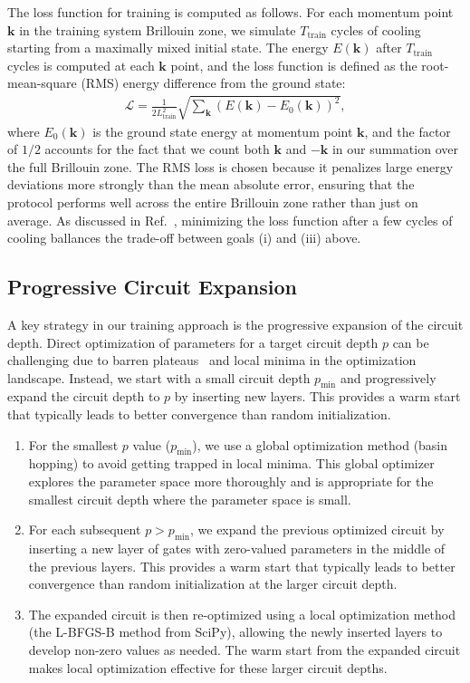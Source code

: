\documentclass[twocolumn,
aps,
prx,
showpacs,
amsmath,
amssymb,
floatfix,
longbibliography,
superscriptaddress,
eprint]
{revtex4-1}
\begin{document}
The loss function for training is computed as follows. For each momentum point $\bm{k}$ in the training system Brillouin zone, we simulate $T_{\text{train}}$ cycles of cooling starting from a maximally mixed initial state. The energy $E(\bm{k})$ after $T_{\text{train}}$ cycles is computed at each $\bm{k}$ point, and the loss function is defined as the root-mean-square (RMS) energy difference from the ground state:
\begin{align}
\mathcal{L} = \frac{1}{2L_{\text{train}}^2}\sqrt{\sum_{\bm{k}} \left(E(\bm{k}) - E_0(\bm{k})\right)^2},
\end{align}
where $E_0(\bm{k})$ is the ground state energy at momentum point $\bm{k}$, and the factor of $1/2$ accounts for the fact that we count both $\bm{k}$ and $-\bm{k}$ in our summation over the full Brillouin zone. The RMS loss is chosen because it penalizes large energy deviations more strongly than the mean absolute error, ensuring that the protocol performs well across the entire Brillouin zone rather than just on average.
As discussed in Ref.~\cite{song2025varicoolnonunitaryquantumvariational}, minimizing the loss function after a few cycles of cooling ballances the trade-off between goals (i) and (iii) above.

\subsection{Progressive Circuit Expansion}

A key strategy in our training approach is the progressive expansion of the circuit depth. Direct optimization of parameters for a target circuit depth $p$ can be challenging due to barren plateaus~\cite{Cerezo2021} and local minima in the optimization landscape. Instead, we start with a small circuit depth $p_{\min}$ and progressively expand the circuit depth to $p$ by inserting new layers. This provides a warm start that typically leads to better convergence than random initialization.

\begin{enumerate}
\item For the smallest $p$ value ($p_{\min}$), we use a global optimization method (basin hopping) to avoid getting trapped in local minima. This global optimizer explores the parameter space more thoroughly and is appropriate for the smallest circuit depth where the parameter space is small.
\item For each subsequent $p > p_{\min}$, we expand the previous optimized circuit by inserting a new layer of gates with zero-valued parameters in the middle of the previous layers. This provides a warm start that typically leads to better convergence than random initialization at the larger circuit depth.
\item The expanded circuit is then re-optimized using a local optimization method (the L-BFGS-B method from SciPy), allowing the newly inserted layers to develop non-zero values as needed. The warm start from the expanded circuit makes local optimization effective for these larger circuit depths.
\end{enumerate}
\end{document}
